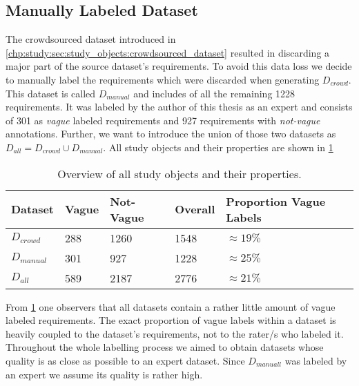 \subsection{Manually Labeled Dataset}
\label{chp:study:sec:study_objects:dataset_creation:manual_labeling}
The crowdsourced dataset introduced in \cref{chp:study:sec:study_objects:crowdsourced_dataset} resulted in discarding a major part of the source dataset's requirements.
To avoid this data loss we decide to manually label the requirements which were discarded when generating $D_{crowd}$.
This dataset is called $D_{manual}$ and includes of all the remaining 1228 requirements.
It was labeled by the author of this thesis as an expert and consists of 301 as \textit{vague} labeled requirements and 927 requirements with \textit{not-vague} annotations.
Further, we want to introduce the union of those two datasets as $D_{all} = D_{crowd} \cup D_{manual}$.
All study objects and their properties are shown in \cref{tab:study:objects:all_datasets}
\newpage
\begin{table}[htpb]
    \centering
    \begin{tabular}{l l l l l}
        \toprule
        Dataset & Vague & Not-Vague & Overall & Proportion Vague Labels \\
        \midrule
        $D_{crowd}$ & 288 & 1260 & 1548 & $\approx19\%$\\
        $D_{manual}$ & 301 & 927 & 1228 & $\approx25\%$\\
        \midrule
        $D_{all}$ & 589 & 2187 & 2776 &  $\approx21\%$\\
        \bottomrule
    \end{tabular}
    \caption[Overview of all study objects]{Overview of all study objects and their properties.}\label{tab:study:objects:all_datasets}
\end{table}

From \cref{tab:study:objects:all_datasets} one observers that all datasets contain a rather little amount of vague labeled requirements.
The exact proportion of vague labels within a dataset is heavily coupled to the dataset's requirements, not to the rater/s who labeled it.
Throughout the whole labelling process we aimed to obtain datasets whose quality is as close as possible to an expert dataset.
Since $D_{manuall}$ was labeled by an expert we assume its quality is rather high.
